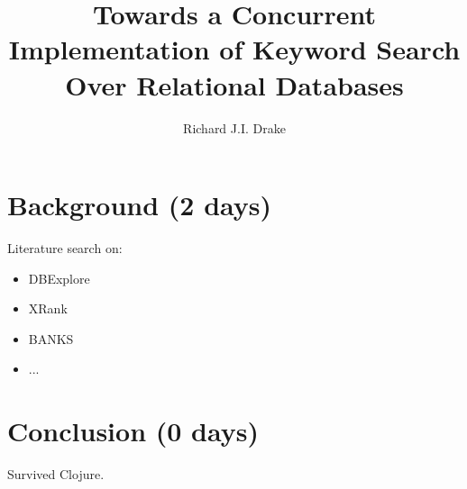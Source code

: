 \documentclass[grad]{uoit-thesis}
\author{Richard J.I. Drake}
\title{Towards a Concurrent Implementation of Keyword Search Over Relational Databases}
\begin{document}
	
	
	
	\begin{preliminary}
		\maketitle

		\setcounter{page}{3}

		\tableofcontents

		\listoftables
		\listoffigures
		\listofalgorithms
		\printglossaries
	\end{preliminary}
	
	\chapter{Background (2 days)}
		Literature search on:

		\begin{itemize}
			\item DBExplore
			\item XRank
			\item BANKS
			\item ...
		\end{itemize}
	
	
	
	
	
	
	
	
	
	\chapter{Conclusion (0 days)}
		Survived Clojure.

	\appendix
	
	\begin{singlespaced}
		
	\end{singlespaced}
	
	\printbibliography
	
	\todos
\end{document}
